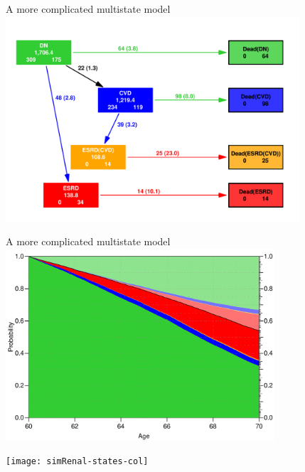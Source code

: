 

\begin{frame}{A more complicated multistate model}
\vspace*{-1em}
\includegraphics[width=0.82\textwidth]{./GbAd-states.pdf}
\end{frame}

\begin{frame}{A more complicated multistate model}
\includegraphics[width=0.75\textwidth]{./GbAd-probs.pdf}
\end{frame}


\begin{frame}
  \texttt{[image: simRenal-states-col]}
\end{frame}

